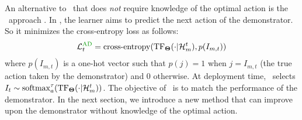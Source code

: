 An alternative to \dpt\ that does \textit{not} require knowledge of the optimal action is the \ad\ approach \citep{laskin2022context, lu2023structured}. In \ad, the learner aims 
to predict the next action of the demonstrator. So it
minimizes the cross-entropy loss as follows:
\begin{align}
    \L^{\mathrm{\ad}}_t = \operatorname{cross-entropy}(\T_\bTheta(\cdot|\H_m^t), p({I}_{m,t})) \label{eq:loss-AD}
\end{align}
where  $p({I}_{m,t})$ is a one-hot vector such that $p(j) = 1$ when $j={I}_{m,t}$ (the true action taken by the demonstrator) and $0$ otherwise. 
%
At deployment time, \ad\ selects $I_t \sim \mathrm{softmax}^\tau_a(\mathrm{TF}_{\mathbf{\Theta}}(\cdot|\mathcal{H}^t_m))$.
%
The objective of \ad\ is to match the performance of the demonstrator.
% 
% 
In the next section, we introduce a new method that can improve upon the demonstrator without knowledge of the optimal action.